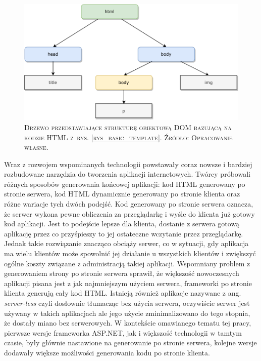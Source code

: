 \documentclass[12pt,a4paper,oneside]{book}
\newcommand{\captionT}[1]{\caption{\textsc{\footnotesize{#1}}}}
\begin{document}
\begin{figure}[H]
\centering
\includegraphics[width=1\textwidth]{images/Html.pdf}
\captionT{Drzewo przedstawiające strukturę obiektową DOM bazującą na kodzie HTML z~rys. \ref{rys_basic_template}. Źródło: Opracowanie własne.}
\label{rys_html}
\end{figure}

Wraz z rozwojem wspominanych technologii powstawały coraz nowsze i bardziej rozbudowane narzędzia do tworzenia aplikacji internetowych. Twórcy próbowali różnych sposobów generowania końcowej aplikacji: kod HTML generowany po stronie serwera, kod HTML dynamicznie generowany po stronie klienta oraz różne wariacje tych dwóch podejść. Kod generowany po stronie serwera oznacza, że serwer wykona pewne obliczenia za przeglądarkę i wyśle do klienta już gotowy kod aplikacji. Jest to podejście lepsze dla klienta, dostanie z serwera gotową aplikację przez co przyśpieszy to jej ostateczne wczytanie przez przeglądarkę. Jednak takie rozwiązanie znacząco obciąży serwer, co w sytuacji, gdy aplikacja ma wielu klientów może spowolnić jej działanie u wszystkich klientów i zwiększyć ogólne koszty związane z administracją takiej aplikacji. Wspomniany problem z generowaniem strony po stronie serwera sprawił, że większość nowoczesnych aplikacji pisana jest z jak najmniejszym użyciem serwera, frameworki po stronie klienta generują cały kod HTML. Istnieją również aplikacje nazywane z ang. \textit{server-less} czyli dosłownie tłumacząc bez użycia serwera, oczywiście serwer jest używany w takich aplikacjach ale jego użycie zminimalizowano do tego stopnia, że dostały miano bez serwerowych. W kontekście omawianego tematu tej pracy, pierwsze wersje frameworka ASP.NET, jak i większość technologii w tamtym czasie, były głównie nastawione na generowanie po stronie serwera, kolejne wersje dodawały większe możliwości generowania kodu po stronie klienta.
\end{document}
